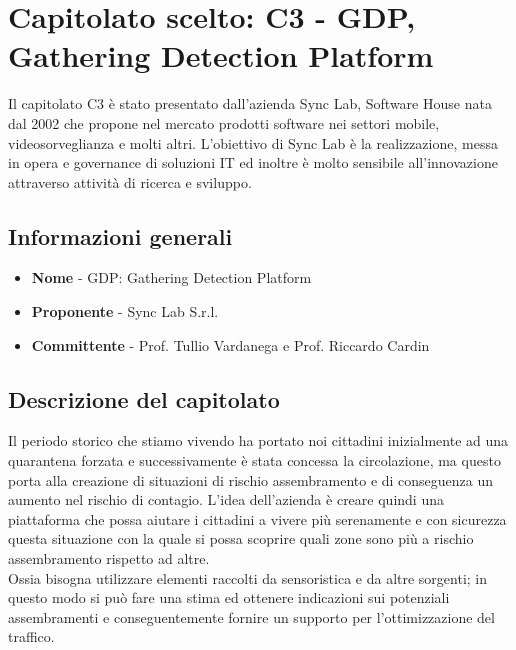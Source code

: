 \chapter{Capitolato scelto: C3 - GDP, Gathering Detection Platform}

Il capitolato C3 è stato presentato dall'azienda Sync Lab, Software House  nata dal 2002 che propone nel mercato prodotti software nei settori mobile, videosorveglianza e molti altri. L’obiettivo di Sync Lab è la realizzazione, messa in opera e governance di soluzioni IT ed inoltre è molto sensibile all'innovazione attraverso attività di ricerca  e sviluppo.

\section{Informazioni generali}
\begin{itemize}
	\item \textbf{Nome} - GDP: Gathering Detection Platform
	\item \textbf{Proponente} - Sync Lab S.r.l.
	\item \textbf{Committente} - Prof. Tullio Vardanega e Prof. Riccardo Cardin
\end{itemize}
\section{Descrizione del capitolato}
Il periodo storico che stiamo vivendo ha portato noi cittadini inizialmente ad una quarantena forzata e successivamente è stata concessa la circolazione, ma questo porta alla creazione di situazioni di rischio assembramento e di conseguenza un aumento nel rischio di contagio. L'idea dell'azienda è creare quindi una piattaforma che possa aiutare i cittadini a vivere più serenamente e con sicurezza questa situazione con la quale si possa scoprire quali zone sono più a rischio assembramento rispetto ad altre. \\
Ossia bisogna utilizzare elementi raccolti da sensoristica e da altre sorgenti; in questo modo si può fare una stima ed ottenere indicazioni sui potenziali assembramenti e conseguentemente fornire un supporto per l'ottimizzazione del traffico.
